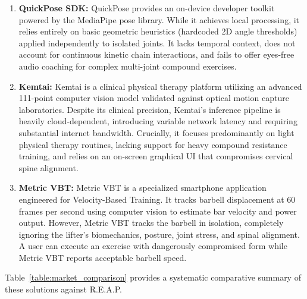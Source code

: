 \documentclass[12pt,a4paper]{report}
\begin{document}
\begin{enumerate}[label=\textbf{\alph*.}]
    \item \textbf{QuickPose SDK:} QuickPose provides an on-device developer toolkit powered by the MediaPipe pose library. While it achieves local processing, it relies entirely on basic geometric heuristics (hardcoded 2D angle thresholds) applied independently to isolated joints. It lacks temporal context, does not account for continuous kinetic chain interactions, and fails to offer eyes-free audio coaching for complex multi-joint compound exercises.
    \item \textbf{Kemtai:} Kemtai is a clinical physical therapy platform utilizing an advanced 111-point computer vision model validated against optical motion capture laboratories. Despite its clinical precision, Kemtai's inference pipeline is heavily cloud-dependent, introducing variable network latency and requiring substantial internet bandwidth. Crucially, it focuses predominantly on light physical therapy routines, lacking support for heavy compound resistance training, and relies on an on-screen graphical UI that compromises cervical spine alignment.
    \item \textbf{Metric VBT:} Metric VBT is a specialized smartphone application engineered for Velocity-Based Training. It tracks barbell displacement at 60 frames per second using computer vision to estimate bar velocity and power output. However, Metric VBT tracks the barbell in isolation, completely ignoring the lifter's biomechanics, posture, joint stress, and spinal alignment. A user can execute an exercise with dangerously compromised form while Metric VBT reports acceptable barbell speed.
\end{enumerate}

Table~\ref{table:market_comparison} provides a systematic comparative summary of these solutions against R.E.A.P.
\end{document}
